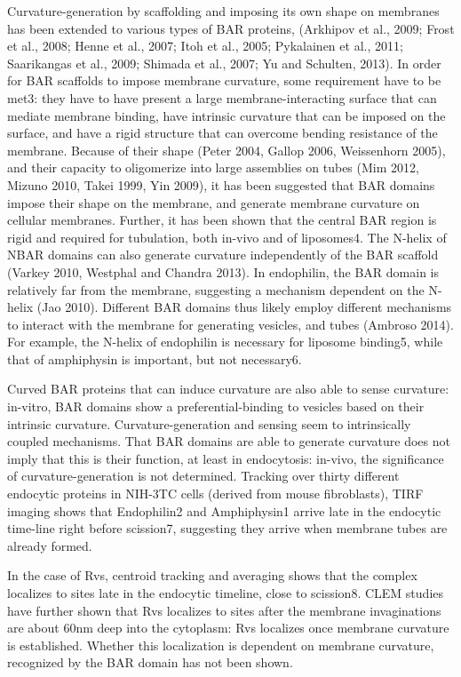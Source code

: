 \vspace{5mm}
			
Curvature-generation by scaffolding and imposing its own shape on membranes has been extended to various types of BAR proteins, (Arkhipov et al., 2009; Frost et al., 2008; Henne et al., 2007; Itoh et al., 2005; Pykalainen et al., 2011; Saarikangas et al., 2009; Shimada et al., 2007; Yu and Schulten, 2013). In order for BAR scaffolds to impose membrane curvature, some requirement have to be met3: they have to have present a large membrane-interacting surface that can mediate membrane binding, have intrinsic curvature that can be imposed on the surface, and have a rigid structure that can overcome bending resistance of the membrane. Because of their shape (Peter 2004, Gallop 2006, Weissenhorn 2005), and their capacity to oligomerize into large assemblies on tubes (Mim 2012, Mizuno 2010, Takei 1999, Yin 2009), it has been suggested that BAR domains impose their shape on the membrane, and generate membrane curvature on cellular membranes. Further, it has been shown that the central BAR region is rigid and required for tubulation, both in-vivo and of liposomes4. The N-helix of NBAR domains can also generate curvature independently of the BAR scaffold (Varkey 2010, Westphal and Chandra 2013). In endophilin, the BAR domain is relatively far from the membrane, suggesting a mechanism dependent on the N-helix (Jao 2010). Different BAR domains thus likely employ different mechanisms to interact with the membrane for generating vesicles, and tubes (Ambroso 2014). For example, the N-helix of endophilin is necessary for liposome binding5, while that of amphiphysin is important, but not necessary6. 


\vspace{5mm}
Curved BAR proteins that can induce curvature are also able to sense curvature: in-vitro, BAR domains show a preferential-binding to vesicles based on their intrinsic curvature. Curvature-generation and sensing seem to intrinsically coupled mechanisms. That BAR domains are able to generate curvature does not imply that this is their function, at least in endocytosis: in-vivo, the significance of curvature-generation is not determined. Tracking over thirty different endocytic proteins in NIH-3TC cells (derived from mouse fibroblasts), TIRF imaging shows that Endophilin2 and Amphiphysin1 arrive late in the endocytic time-line right before scission7, suggesting they arrive when membrane tubes are already formed. 


\vspace{5mm}
In the case of Rvs, centroid tracking and averaging shows that the complex localizes to sites late in the endocytic timeline, close to scission8. CLEM studies have further shown that Rvs localizes to sites after the membrane invaginations are about 60nm deep into the cytoplasm: Rvs localizes once membrane curvature is established. Whether this localization is dependent on membrane curvature, recognized by the BAR domain has not been shown. 



